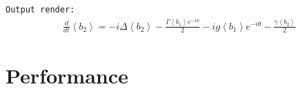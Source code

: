\documentclass[onecolumn, 12pt, sort&compress]{elsarticle}
\newcommand{\inlinecode}[1]{\texttt{#1}}
\newenvironment{revision2}{%
\color{red}
}
{}
\begin{document}
\begin{revision2}
\inlinecode{Output render:}
\begin{align*}
\frac{d}{d t} {\left\langle b_{2} \right\rangle} = - i \Delta {\left\langle b_{2} \right\rangle} - \frac{\Gamma {\left\langle b_{1} \right\rangle} e^{- i \phi}}{2} - i g {\left\langle b_{1} \right\rangle} e^{- i \theta} - \frac{\gamma {\left\langle b_{2} \right\rangle}}{2}
\end{align*}
\end{revision2}

\section{Performance}\label{section:performance}
\end{document}
